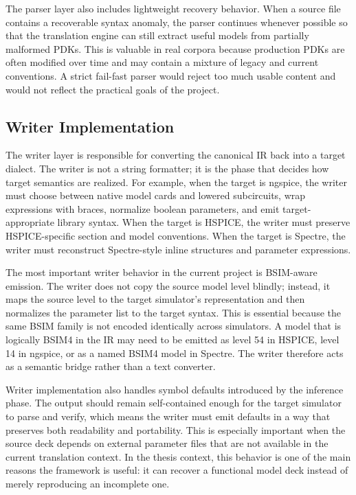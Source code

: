 \documentclass[10pt,twocolumn]{article}
\begin{document}
The parser layer also includes lightweight recovery behavior. When a source file contains a recoverable syntax anomaly, the parser continues whenever possible so that the translation engine can still extract useful models from partially malformed PDKs. This is valuable in real corpora because production PDKs are often modified over time and may contain a mixture of legacy and current conventions. A strict fail-fast parser would reject too much usable content and would not reflect the practical goals of the project.

\subsection{Writer Implementation}

The writer layer is responsible for converting the canonical IR back into a target dialect. The writer is not a string formatter; it is the phase that decides how target semantics are realized. For example, when the target is ngspice, the writer must choose between native model cards and lowered subcircuits, wrap expressions with braces, normalize boolean parameters, and emit target-appropriate library syntax. When the target is HSPICE, the writer must preserve HSPICE-specific section and model conventions. When the target is Spectre, the writer must reconstruct Spectre-style inline structures and parameter expressions.

The most important writer behavior in the current project is BSIM-aware emission. The writer does not copy the source model level blindly; instead, it maps the source level to the target simulator's representation and then normalizes the parameter list to the target syntax. This is essential because the same BSIM family is not encoded identically across simulators. A model that is logically BSIM4 in the IR may need to be emitted as level 54 in HSPICE, level 14 in ngspice, or as a named BSIM4 model in Spectre. The writer therefore acts as a semantic bridge rather than a text converter.

Writer implementation also handles symbol defaults introduced by the inference phase. The output should remain self-contained enough for the target simulator to parse and verify, which means the writer must emit defaults in a way that preserves both readability and portability. This is especially important when the source deck depends on external parameter files that are not available in the current translation context. In the thesis context, this behavior is one of the main reasons the framework is useful: it can recover a functional model deck instead of merely reproducing an incomplete one.
\end{document}
